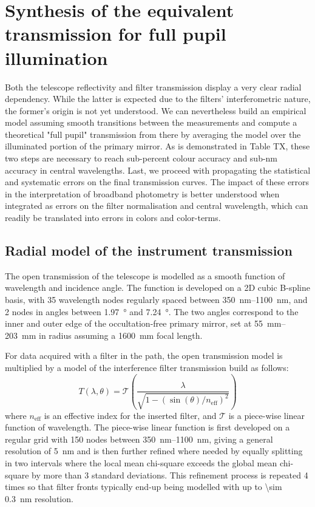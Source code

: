 \section{Synthesis of the equivalent transmission for full pupil illumination}
\label{sec:discussion}

Both the telescope reflectivity and filter transmission display a very
clear radial dependency. While the latter is expected due to the
filters' interferometric nature, the former's origin is not
yet understood. We can nevertheless build an empirical model assuming
smooth transitions between the measurements and compute a
theoretical "full pupil" transmission from there by averaging the model over the
illuminated portion of the primary mirror. As is demonstrated in Table
TX, these two steps are necessary to reach sub-percent colour accuracy and sub-nm accuracy in central wavelengths. Last, we proceed
with propagating the statistical and systematic errors on the final
transmission curves. The impact of these errors in the interpretation
of broadband photometry is better understood when integrated as errors
on the filter normalisation and central wavelength, which can readily
be translated into errors in colors and color-terms.


\subsection{Radial model of the instrument transmission}
\label{sec:model}

The open transmission of the telescope is modelled as a smooth function
of wavelength and incidence angle. The function is developed on a 2D
cubic B-spline basis, with \num{35} wavelength nodes regularly spaced
between \SIrange{350}{1100}{nm}, and 2 nodes in angles between
\SI{1.97}{\degree} and \SI{7.24}{\degree}. The two angles correspond
to the inner and outer edge of the occultation-free primary mirror,
set at \SIrange{55}{203}{mm} in radius assuming a \SI{1600}{mm} focal
length.

For data acquired with a filter in the path, the open transmission
model is multiplied by a model of the interference filter transmission
build as follows:
\begin{equation}
  \label{eq:filtertransmission}
T(\lambda, \theta) = \mathcal T\left(\frac{\lambda}{\sqrt{1 -
    (\sin(\theta) / n_\text{eff})^2}}\right)
\end{equation}
where $n_\text{eff}$ is an effective index for the inserted filter,
and $\mathcal T$ is a piece-wise linear function of wavelength. The piece-wise linear function is first developed on a regular grid with
\num{150} nodes between \SIrange{350}{1100}{nm}, giving a general
resolution of \SI{5}{nm} and is then further refined where needed by
equally splitting in two intervals where the local mean chi-square
exceeds the global mean chi-square by more than $3$ standard
deviations. This refinement process is repeated \num{4} times so that
filter fronts typically end-up being modelled with up to \SI{\sim
  0.3}{nm} resolution.

